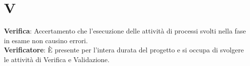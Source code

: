 \section{V}
\textbf{Verifica}: Accertamento che l’esecuzione delle attività di processi svolti nella fase in esame non causino errori.\\
\textbf{Verificatore}: È presente per l'intera durata del progetto e si occupa di svolgere le attività di Verifica e Validazione.\\